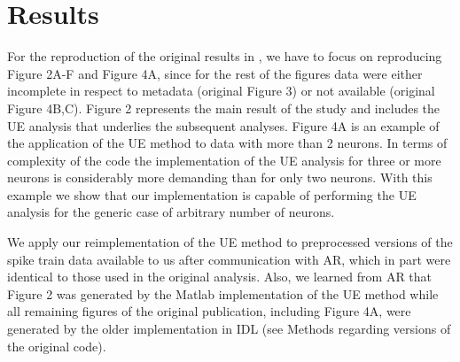 \documentclass[10pt,a4paper,onecolumn]{article}
\begin{document}
\section{Results}\label{results}

For the reproduction of the original results in \autocite{Riehle97}, we
have to focus on reproducing Figure 2A-F and Figure 4A, since for the
rest of the figures data were either incomplete in respect to metadata
(original Figure 3) or not available (original Figure 4B,C). Figure 2
represents the main result of the study and includes the UE analysis
that underlies the subsequent analyses. Figure 4A is an example of the
application of the UE method to data with more than 2 neurons. In terms
of complexity of the code the implementation of the UE analysis for
three or more neurons is considerably more demanding than for only two
neurons. With this example we show that our implementation is capable of
performing the UE analysis for the generic case of arbitrary number of
neurons.

We apply our reimplementation of the UE method to preprocessed versions
of the spike train data available to us after communication with AR,
which in part were identical to those used in the original analysis.
Also, we learned from AR that Figure 2 was generated by the Matlab
implementation of the UE method while all remaining figures of the
original publication, including Figure 4A, were generated by the older
implementation in IDL (see Methods regarding versions of the original
code).
\end{document}

